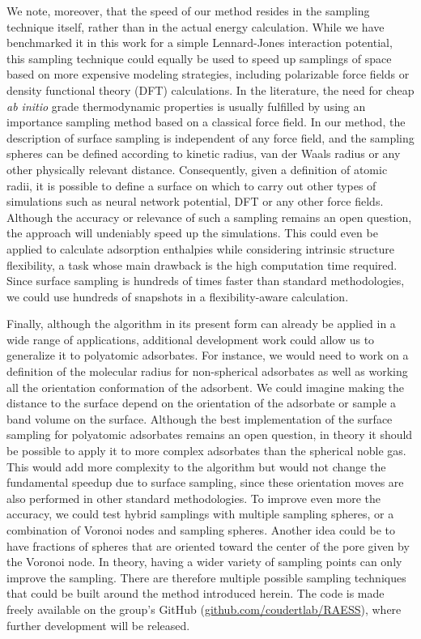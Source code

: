\documentclass[main]{subfiles}
\begin{document}
We note, moreover, that the speed of our method resides in the sampling technique itself, rather than in the actual energy calculation. While we have benchmarked it in this work for a simple Lennard-Jones interaction potential, this sampling technique could equally be used to speed up samplings of space based on more expensive modeling strategies, including polarizable force fields or density functional theory (DFT) calculations. In the literature, the need for cheap \emph{ab initio} grade thermodynamic properties is usually fulfilled by using an importance sampling method based on a classical force field.\autocite{Vandenbrande2018} In our method, the description of surface sampling is independent of any force field, and the sampling spheres can be defined according to kinetic radius, van der Waals radius or any other physically relevant distance. {Consequently, given a definition of atomic radii, it is possible to define a surface on which to carry out other types of simulations such as neural network potential, DFT or any other force fields. Although the accuracy or relevance of such a sampling remains an open question, the approach will undeniably speed up the simulations.} This could even be applied to calculate adsorption enthalpies while considering intrinsic structure flexibility,\autocite{Witman_2017} a task whose main drawback is the high computation time required. Since surface sampling is hundreds of times faster than standard methodologies, we could use hundreds of snapshots in a flexibility-aware calculation.

Finally, although the algorithm in its present form can already be applied in a wide range of applications, additional development work could allow us to generalize it to polyatomic adsorbates. For instance, we would need to {work on a definition of the molecular radius for non-spherical adsorbates as well as working} all the orientation conformation of the adsorbent. {We could imagine making the distance to the surface depend on the orientation of the adsorbate or sample a band volume on the surface. Although the best implementation of the surface sampling for polyatomic adsorbates remains an open question, in theory it should be possible to apply it to more complex adsorbates than the spherical noble gas. } This would add more complexity to the algorithm but would not change the fundamental speedup due to surface sampling, since these orientation moves are also performed in other standard methodologies. To improve even more the accuracy, we could test hybrid samplings with multiple sampling spheres, or a combination of Voronoi nodes and sampling spheres. Another idea could be to have fractions of spheres that are oriented toward the center of the pore given by the Voronoi node. In theory, having a wider variety of sampling points can only improve the sampling. There are therefore multiple possible sampling techniques that could be built around the method introduced herein. {The code is made freely available on the group's GitHub (\url{github.com/coudertlab/RAESS}), where further development will be released.}
\end{document}
